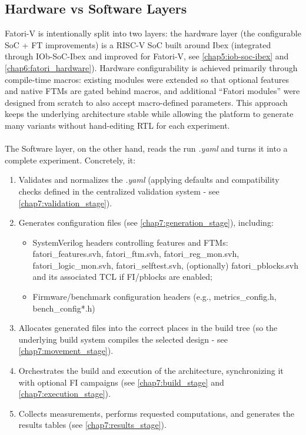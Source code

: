 \subsection{Hardware vs Software Layers}
\label{chap3:hwvssw}
 Fatori-V is intentionally split into two layers: the hardware layer (the configurable \ac{SoC} + \ac{FT} improvements) is a RISC-V \ac{SoC} built around Ibex (integrated through IOb-SoC-Ibex and improved for Fatori-V, see \cref{chap5:iob-soc-ibex} and \cref{chap6:fatori_hardware}). Hardware configurability is achieved primarily through compile-time macros: existing modules were extended so that optional features and native \acp{FTM} are gated behind macros, and additional “Fatori modules” were designed from scratch to also accept macro-defined parameters. This approach keeps the underlying architecture stable while allowing the platform to generate many variants without hand-editing \ac{RTL} for each experiment.\\\\
The Software layer, on the other hand, reads the run \textit{.yaml} and turns it into a complete experiment. Concretely, it:
\begin{enumerate}
    \item Validates and normalizes the \textit{.yaml} (applying defaults and compatibility checks defined in the centralized validation system - see \cref{chap7:validation_stage}).
    \item Generates configuration files (see \cref{chap7:generation_stage}), including:
    \begin{itemize}
        \item SystemVerilog headers controlling features and FTMs: fatori\_features.svh, fatori\_ftm.svh, fatori\_reg\_mon.svh, fatori\_logic\_mon.svh, fatori\_selftest.svh, (optionally) fatori\_pblocks.svh and its associated TCL if FI/pblocks are enabled;
        \item Firmware/benchmark configuration headers (e.g., metrics\_config.h, bench\_config*.h)
    \end{itemize}
    \item Allocates generated files into the correct places in the build tree (so the underlying build system compiles the selected design - see \cref{chap7:movement_stage}).
    \item Orchestrates the build and execution of the architecture, synchronizing it with optional FI campaigns (see \cref{chap7:build_stage} and \cref{chap7:execution_stage}).
    \item Collects measurements, performs requested computations, and generates the results tables (see \cref{chap7:results_stage}).
\end{enumerate}

